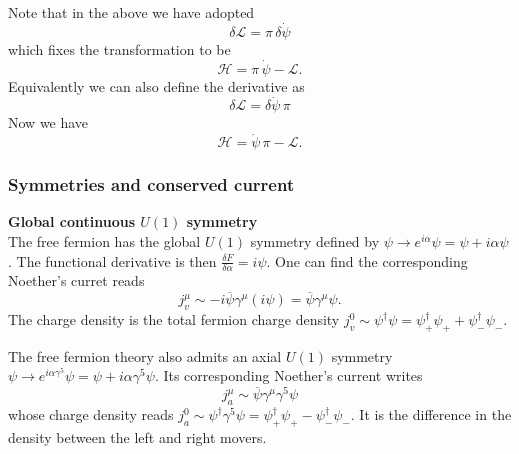 \documentclass[submission, PhysLectNotes]{SciPost}
\begin{document}
Note that in the above we have adopted
\begin{equation}
	\delta \mathcal{L} = \pi\,\delta \dot{\psi}
\end{equation}
which fixes the transformation to be 
\begin{equation}
	\mathcal{H} = \pi \,\dot{\psi} - \mathcal{L}.
\end{equation}
Equivalently we can also define the derivative as
\begin{equation}
	\delta \mathcal{L} = \delta \dot{\psi} \,\pi
\end{equation}
Now we have 
\begin{equation}
	\mathcal{H} = \dot{\psi} \, \pi - \mathcal{L}.
\end{equation}

\subsubsection{Symmetries and conserved current}
{\bf Global continuous $U(1)$ symmetry}\\
The free fermion has the global $U(1)$ symmetry defined by $\psi \rightarrow e^{i\alpha}\psi = \psi + i\alpha \psi$. The functional derivative is then $\frac{\delta F}{\delta \alpha} = i\psi$. One can find the corresponding Noether's curret reads
\begin{equation}
	j_v^\mu \sim -i\overline{\psi} \gamma^\mu \left(i\psi\right) = \overline{\psi} \gamma^\mu \psi.
\end{equation}
The charge density is the total fermion charge density $j_v^0 \sim \psi^\dagger \psi = \psi_{+}^\dagger\psi_{+} + \psi_{-}^\dagger\psi_{-}$.

The free fermion theory also admits an axial $U(1)$ symmetry $\psi \rightarrow e^{i\alpha \gamma^5} \psi = \psi + i\alpha \gamma^5 \psi$. Its corresponding Noether's current writes
\begin{equation}
	j_a^\mu \sim \overline{\psi} \gamma^\mu\gamma^5 \psi
\end{equation}
whose charge density reads $j^0_a \sim \psi^\dagger \gamma^5 \psi = \psi_{+}^\dagger \psi_{+} - \psi_{-}^\dagger \psi_{-}$. It is the difference in the density between the left and right movers.
\end{document}

